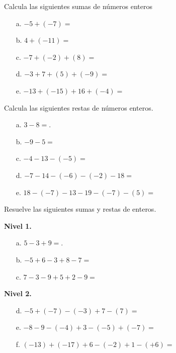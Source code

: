 \documentclass[spanish,letterpaper, 11pt, addpoints, answers]{exam}
\begin{document}
\begin{questions}

\question Calcula las siguientes sumas de números enteros

\begin{itemize}
\item[a. ]$-5+(-7) =$
\vspace{4cm}
\item[b. ]$4+(-11) =$
\vspace{4cm}
\item[c. ]$-7+(-2)+(8) =$
\vspace{4cm}
\item[d. ]$-3+7+(5)+(-9) =$
\vspace{4cm}
\item[e. ]$-13+(-15)+16+(-4)=$
\vspace{4cm}
\end{itemize}


\question Calcula las siguientes restas de números enteros.

\begin{itemize}
\item[a.] $3-8=$.
\vspace{4cm}
\item[b.] $-9-5=$
\vspace{4cm}
\item[c.] $-4-13-(-5)=$
\vspace{4cm}
\item[d.] $-7-14-(-6)-(-2)-18=$
\vspace{4cm}
\item[e.] $18-(-7)-13-19-(-7)-(5)=$
\vspace{4cm}

\end{itemize}


\question Resuelve las siguientes sumas y restas de enteros.

\textbf{Nivel 1.}\\
\begin{itemize}
\item[a.] $5-3+9=$.
\vspace{6cm}
\item[b.] $-5+6-3+8-7=$
\vspace{6cm}
\item[c.] $7-3-9+5+2-9=$
\vspace{6cm}
\end{itemize}
\newpage
\textbf{Nivel 2.}\\
\begin{itemize}
\item[d.] $-5+(-7)-(-3)+7-(7)=$
\vspace{6cm}
\item[e.] $-8-9-(-4)+3-(-5)+(-7)=$
\vspace{6cm}
\item[f.] $(-13)+(-17)+6-(-2)+1-(+6)=$
\vspace{6cm}
\end{itemize}


\end{questions}
\end{document}

